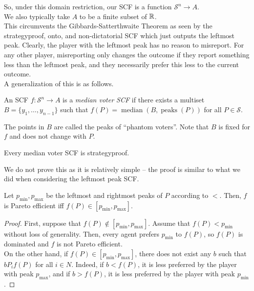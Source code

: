 		So, under this domain restriction, our SCF is a function $\mathcal{S}^n \to A$.\\
		We also typically take $A$ to be a finite subset of $\mathbb{R}$.\\
		This circumvents the Gibbards-Satterthwaite Theorem as seen by the strategyproof, onto, and non-dictatorial SCF which just outputs the leftmost peak. Clearly, the player with the leftmost peak has no reason to misreport. For any other player, misreporting only changes the outcome if they report something less than the leftmost peak, and they necessarily prefer this less to the current outcome.\\
		A generalization of this is as follows.

		\begin{fdef}
			An SCF $f : \mathcal{S}^n \to A$ is a \emph{median voter SCF} if there exists a multiset $B = \{y_1,\ldots,y_{n-1}\}$ such that $f(P) = \operatorname{median}(B,\operatorname{peaks}(P))$ for all $P \in \mathcal{S}$.
		\end{fdef}

		The points in $B$ are called the peaks of ``phantom voters''. Note that $B$ is fixed for $f$ and does not change with $P$.

		\begin{flem}[Moulin 1980]
			\label{lem: median stratproof}
			Every median voter SCF is strategyproof.
		\end{flem}

		We do not prove this as it is relatively simple -- the proof is similar to what we did when considering the leftmost peak SCF.

		\begin{fprop}
			Let $p_{\min},p_{\max}$ be the leftmost and rightmost peaks of $P$ according to $<$. Then, $f$ is Pareto efficient iff $f(P) \in [p_{\min},p_{\max}]$.
		\end{fprop}

		\begin{proof}
			First, suppose that $f(P) \not\in [p_{\min},p_{\max}]$. Assume that $f(P) < p_{\min}$ without loss of generality. Then, every agent prefers $p_{\min}$ to $f(P)$, so $f(P)$ is dominated and $f$ is not Pareto efficient.\\
			On the other hand, if $f(P) \in [p_{\min},p_{\max}]$, there does not exist any $b$ such that $b P_i f(P)$ for all $i \in N$. Indeed, if $b < f(P)$, it is less preferred by the player with peak $p_{\max}$, and if $b > f(P)$, it is less preferred by the player with peak $p_{\min}$.
		\end{proof}

